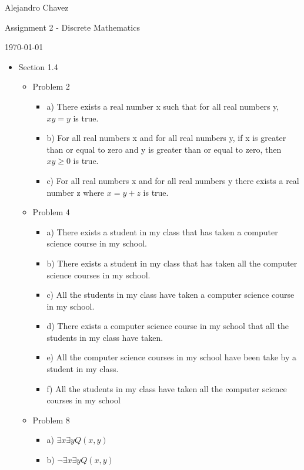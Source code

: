 \documentclass[10pt,a4paper]{article}
\begin{document}
\hfill Alejandro Chavez

\hfill Assignment 2 - Discrete Mathematics

\hfill \today\\

\begin{itemize}
  \item Section 1.4
    \begin{itemize}
      \item Problem 2
        \begin{itemize}
          \item a)
            There exists a real number x such that for all real numbers y, $xy = y$ is true.
          \item b)
            For all real numbers x and for all real numbers y, if x is greater than or equal to zero and y is greater than or equal to zero, then $xy\ge0$ is true.
          \item c)
            For all real numbers x and for all real numbers y there exists a real number z where $x = y + z$ is true.
        \end{itemize}
      \item Problem 4 
        \begin{itemize}
          \item a)
            There exists a student in my class that has taken a computer science course in my school.
          \item b)
            There exists a student in my class that has taken all the computer science courses in my school.
          \item c)
            All the students in my class have taken a computer science course in my school.
          \item d)
            There exists a computer science course in my school that all the students in my class have taken.
          \item e)
            All the computer science courses in my school have been take by a student in my class.
          \item f)
            All the students in my class have taken all the computer science courses in my school
         \end{itemize}
      \item Problem 8
        \begin{itemize}
          \item a)
           $\exists x\exists yQ(x,y)$ 
          \item b)
            $\lnot \exists x\exists yQ(x,y)$

\end{itemize}
\end{itemize}
\end{itemize}
\end{document}
